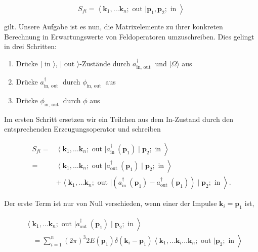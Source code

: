 \documentclass[10pt, letterpaper]{article}
\begin{document}
$$
\left.S_{f i}=\left\langle\mathbf{k}_{1}, \ldots \mathbf{k}_{n} ; \text { out }\right| \mathbf{p}_{1}, \mathbf{p}_{2} ; \text { in }\right\rangle
$$

gilt. Unsere Aufgabe ist es nun, die Matrixelemente zu ihrer konkreten Berechnung in Erwartungswerte von Feldoperatoren umzuschreiben. Dies gelingt in drei Schritten:

\begin{enumerate}
  \item Drücke $\mid$ in $\rangle$, $\mid$ out $\rangle$-Zustände durch $a_{\text {in, out }}^{\dagger}$ und $|\Omega\rangle$ aus
  \item Drücke $a_{\text {in, out }}^{\dagger}$ durch $\phi_{\text {in, out }}$ aus
  \item Drücke $\phi_{\text {in, out }}$ durch $\phi$ aus
\end{enumerate}

Im ersten Schritt ersetzen wir ein Teilchen aus dem In-Zustand durch den entsprechenden Erzeugungsoperator und schreiben

$$
\begin{aligned}
S_{f i}= & \left.\left\langle\mathbf{k}_{1}, \ldots \mathbf{k}_{n} ; \text { out }\right| a_{\text {in }}^{\dagger}\left(\mathbf{p}_{1}\right) \mid \mathbf{p}_{2} ; \text { in }\right\rangle \\
= & \left.\left\langle\mathbf{k}_{1}, \ldots \mathbf{k}_{n} ; \text { out }\right| a_{\text {out }}^{\dagger}\left(\mathbf{p}_{1}\right) \mid \mathbf{p}_{2} ; \text { in }\right\rangle \\
& \left.+\left\langle\mathbf{k}_{1}, \ldots \mathbf{k}_{n} ; \text { out }\right|\left(a_{\text {in }}^{\dagger}\left(\mathbf{p}_{1}\right)-a_{\text {out }}^{\dagger}\left(\mathbf{p}_{1}\right)\right) \mid \mathbf{p}_{2} ; \text { in }\right\rangle .
\end{aligned}
$$

Der erste Term ist nur von Null verschieden, wenn einer der Impulse $\mathbf{k}_{i}=\mathbf{p}_{1}$ ist,

$$
\begin{aligned}
& \left.\left\langle\mathbf{k}_{1}, \ldots \mathbf{k}_{n} ; \text { out }\right| a_{\text {out }}^{\dagger}\left(\mathbf{p}_{1}\right) \mid \mathbf{p}_{2} ; \text { in }\right\rangle \\
& \left.\quad=\sum_{i=1}^{n}(2 \pi)^{3} 2 E\left(\mathbf{p}_{1}\right) \delta\left(\mathbf{k}_{i}-\mathbf{p}_{1}\right)\left\langle\mathbf{k}_{1}, \ldots \mathbf{k}_{i} \ldots \mathbf{k}_{n} ; \text { out }\right| \mathbf{p}_{2} ; \text { in }\right\rangle
\end{aligned}
$$
\end{document}

